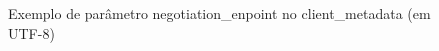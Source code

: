 \begin{figure}[htb]
    \caption{Exemplo de parâmetro negotiation\_enpoint no client\_metadata (em UTF-8)}
    \centering
    
    \label{fig:negotiation-endpoint}
\end{figure}